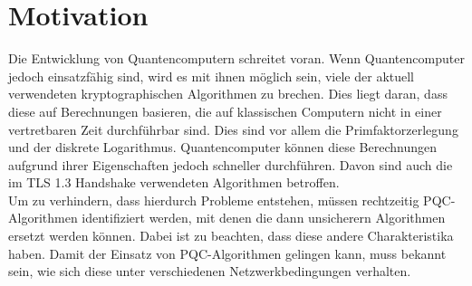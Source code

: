 \section{Motivation}

\label{sec:intro:motivation}

Die Entwicklung von Quantencomputern schreitet voran. Wenn Quantencomputer jedoch einsatzfähig sind, wird es mit ihnen möglich sein, viele der aktuell verwendeten kryptographischen Algorithmen zu brechen. Dies liegt daran, dass diese auf Berechnungen basieren, die auf klassischen Computern nicht in einer vertretbaren Zeit durchführbar sind. Dies sind vor allem die Primfaktorzerlegung und der diskrete Logarithmus. Quantencomputer können diese Berechnungen aufgrund ihrer Eigenschaften jedoch schneller durchführen. Davon sind auch die im TLS 1.3 Handshake verwendeten Algorithmen betroffen.\\

Um zu verhindern, dass hierdurch Probleme entstehen, müssen rechtzeitig PQC-Algorithmen identifiziert werden, mit denen die dann unsicherern Algorithmen ersetzt werden können. Dabei ist zu beachten, dass diese andere Charakteristika haben. Damit der Einsatz von PQC-Algorithmen gelingen kann, muss bekannt sein, wie sich diese unter verschiedenen Netzwerkbedingungen verhalten.